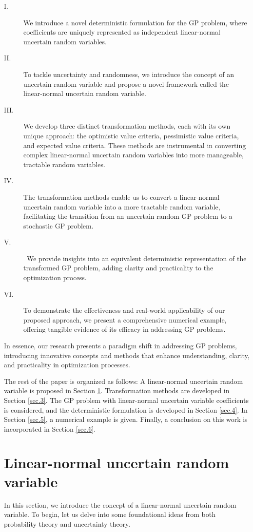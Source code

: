 \begin{description}
	\item[I.] We introduce a novel deterministic formulation for the GP problem, where coefficients are uniquely represented as independent linear-normal uncertain random variables. 
	\item[II.] To tackle uncertainty and randomness, we introduce the concept of an uncertain random variable and propose a novel framework called the linear-normal uncertain random variable.
	\item[III.] We develop three distinct transformation methods, each with its own unique approach: the optimistic value criteria, pessimistic value criteria, and expected value criteria. These methods are instrumental in converting complex linear-normal uncertain random variables into more manageable, tractable random variables. 
	\item[IV.] The transformation methods enable us to convert a linear-normal uncertain random variable into a more tractable random variable, facilitating the transition from an uncertain random GP problem to a stochastic GP problem.
	\item[V.] We provide insights into an equivalent deterministic representation of the transformed GP problem, adding clarity and practicality to the optimization process.
	\item[VI.] To demonstrate the effectiveness and real-world applicability of our proposed approach, we present a comprehensive numerical example, offering tangible evidence of its efficacy in addressing GP problems.
\end{description}
 In essence, our research presents a paradigm shift in addressing GP problems, introducing innovative concepts and methods that enhance understanding, clarity, and practicality in optimization processes. 
\par The rest of the paper is organized as follows: A linear-normal uncertain random variable is proposed in Section \ref{sec.2}. Transformation methods are developed in Section \ref{sec.3}. The GP problem with linear-normal uncertain variable coefficients is considered, and the deterministic formulation is developed in Section \ref{sec.4}. In Section \ref{sec.5}, a numerical example is given. Finally, a conclusion on this work is incorporated in Section \ref{sec.6}.
\section{Linear-normal uncertain random variable}\label{sec.2} 
In this section, we introduce the concept of a linear-normal uncertain random variable. To begin, let us delve into some foundational ideas from both probability theory and uncertainty theory.
